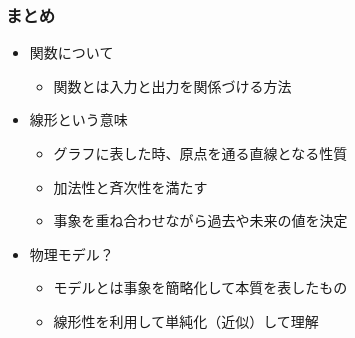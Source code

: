 \documentclass[unicode,12pt,aspectratio=169]{beamer}
\begin{document}
\begin{frame}
	\frametitle{まとめ}
	\begin{boxnote}
		\vspace{-3mm}
		\begin{itemize}
			\item 関数について
			\begin{itemize}
				\item 関数とは入力と出力を関係づける方法
			\end{itemize} 
			\item 線形という意味
			\begin{itemize}
				\item グラフに表した時、原点を通る直線となる性質
				\item 加法性と斉次性を満たす
				\item 事象を重ね合わせながら過去や未来の値を決定
			\end{itemize} 
			\item 物理モデル？
			\begin{itemize}
				\item モデルとは事象を簡略化して本質を表したもの
				\item 線形性を利用して単純化（近似）して理解
			\end{itemize} 
		\end{itemize}
	\end{boxnote}
\end{frame}
\end{document}
